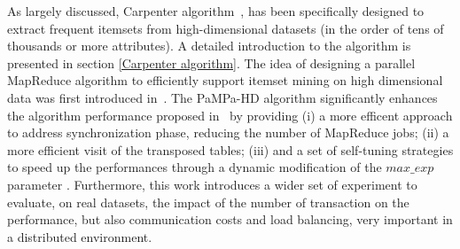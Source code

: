 As largely discussed, Carpenter algorithm~\cite{Zaki_Carpenter}, 
has been specifically designed to extract frequent itemsets
from high-dimensional datasets (in the order of tens of thousands or more attributes). A detailed introduction to the algorithm is presented in section \ref{Carpenter
algorithm}.
The idea of designing a parallel MapReduce algorithm to efficiently support
itemset mining on high dimensional data was first introduced in~\cite{pampa_v1}.
The PaMPa-HD algorithm significantly enhances the algorithm performance proposed in~\cite{pampa_v1}
by providing (i) a more efficent approach to address synchronization phase, reducing the number of MapReduce jobs; (ii) a
more efficient visit of the transposed tables; (iii) and a set of self-tuning strategies to speed up the performances through a dynamic modification of the $max\_exp$ parameter . Furthermore, this work introduces a wider set of experiment to evaluate, on real datasets, the impact of the number of transaction on the performance, but also communication costs and load balancing, very important in a distributed environment.

